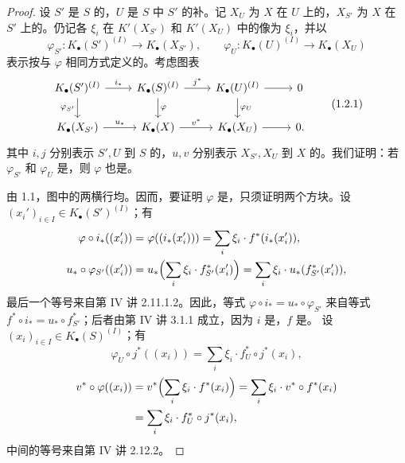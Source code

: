 \begin{proof}
设 $S'$ 是 $S$ 的，$U$ 是 $S$ 中 $S'$ 的补。记 $X_U$ 为 $X$ 在 $U$ 上的，$X_{S'}$ 为 $X$ 在 $S'$ 上的。仍记各 $\xi_i$ 在 $K'(X_{S'})$ 和 $K'(X_U)$ 中的像为 $\xi_i$，并以
\[
\varphi_{S'}:K_\bullet(S')^{(I)}\longrightarrow K_\bullet(X_{S'}),\qquad
\varphi_U:K_\bullet(U)^{(I)}\longrightarrow K_\bullet(X_U)
\]
表示按与 $\varphi$ 相同方式定义的。考虑图表
\begin{equation}
\begin{tikzcd}
K_\bullet(S')^{(I)}\arrow[r,"i_*"]\arrow[d,"\varphi_{S'}"']&K_\bullet(S)^{(I)}\arrow[r,"j^*"]\arrow[d,"\varphi"]&K_\bullet(U)^{(I)}\arrow[r]\arrow[d,"\varphi_U"]&0\\
K_\bullet(X_{S'})\arrow[r,"u_*"]&K_\bullet(X)\arrow[r,"v^*"]&K_\bullet(X_U)\arrow[r]&0.
\end{tikzcd}\tag{1.2.1}
\end{equation}
其中 $i,j$ 分别表示 $S',U$ 到 $S$ 的，$u,v$ 分别表示 $X_{S'},X_U$ 到 $X$ 的。我们证明：若 $\varphi_{S'}$ 和 $\varphi_U$ 是，则 $\varphi$ 也是。

由 1.1，图中的两横行均。因而，要证明 $\varphi$ 是，只须证明两个方块。设 $(x_i')_{i\in I}\in K_\bullet(S')^{(I)}$；有
\[
\begin{aligned}
\varphi\circ i_*((x_i'))&=\varphi((i_*(x_i')))=\sum_i\xi_i\cdot f^*(i_*(x_i')),\\
u_*\circ\varphi_{S'}((x_i'))&=u_*\Bigl(\sum_i\xi_i\cdot f_{S'}^*(x_i')\Bigr)
=\sum_i\xi_i\cdot u_*(f_{S'}^*(x_i')),
\end{aligned}
\]
最后一个等号来自第 IV 讲 2.11.1.2。因此，等式 $\varphi\circ i_*=u_*\circ\varphi_{S'}$ 来自等式 $f^*\circ i_*=u_*\circ f_{S'}^*$；后者由第 IV 讲 3.1.1 成立，因为 $i$ 是，$f$ 是。
设 $(x_i)_{i\in I}\in K_\bullet(S)^{(I)}$；有
\[
\varphi_U\circ j^*((x_i))=\sum_i\xi_i\cdot f_U^*\circ j^*(x_i),
\]
\[
\begin{aligned}
v^*\circ\varphi((x_i))
&=v^*\Bigl(\sum_i\xi_i\cdot f^*(x_i)\Bigr)
=\sum_i\xi_i\cdot v^*\circ f^*(x_i)\\
&=\sum_i\xi_i\cdot f_U^*\circ j^*(x_i),
\end{aligned}
\]
中间的等号来自第 IV 讲 2.12.2。


\end{proof}
